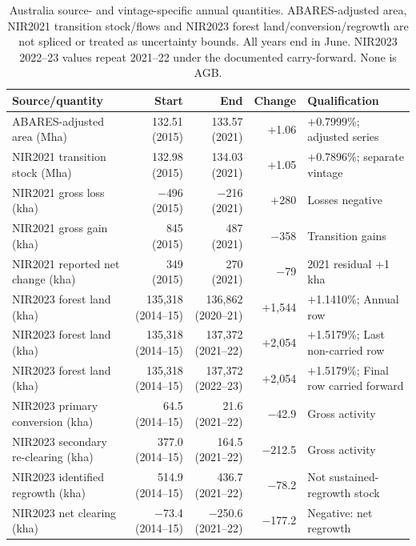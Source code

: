 \begin{table}[htbp]
\centering\small
\caption{Australia source- and vintage-specific annual quantities. ABARES-adjusted area, NIR2021 transition stock/flows and NIR2023 forest land/conversion/regrowth are not spliced or treated as uncertainty bounds. All years end in June. NIR2023 2022--23 values repeat 2021--22 under the documented carry-forward. None is AGB.}\label{tab:SI_Australia_reported}
\begin{tabularx}{\textwidth}{XrrrX}\toprule
Source/quantity & Start & End & Change & Qualification\\\midrule
ABARES-adjusted area (Mha) & 132.51 (2015) & 133.57 (2021) & $+$1.06 & $+$0.7999\%; adjusted series\\
NIR2021 transition stock (Mha) & 132.98 (2015) & 134.03 (2021) & $+$1.05 & $+$0.7896\%; separate vintage\\
NIR2021 gross loss (kha) & $-$496 (2015) & $-$216 (2021) & $+$280 & Losses negative\\
NIR2021 gross gain (kha) & 845 (2015) & 487 (2021) & $-$358 & Transition gains\\
NIR2021 reported net change (kha) & 349 (2015) & 270 (2021) & $-$79 & 2021 residual +1 kha\\
NIR2023 forest land (kha) & 135,318 (2014--15) & 136,862 (2020--21) & $+$1,544 & $+$1.1410\%; Annual row\\
NIR2023 forest land (kha) & 135,318 (2014--15) & 137,372 (2021--22) & $+$2,054 & $+$1.5179\%; Last non-carried row\\
NIR2023 forest land (kha) & 135,318 (2014--15) & 137,372 (2022--23) & $+$2,054 & $+$1.5179\%; Final row carried forward\\
NIR2023 primary conversion (kha) & 64.5 (2014--15) & 21.6 (2021--22) & $-$42.9 & Gross activity\\
NIR2023 secondary re-clearing (kha) & 377.0 (2014--15) & 164.5 (2021--22) & $-$212.5 & Gross activity\\
NIR2023 identified regrowth (kha) & 514.9 (2014--15) & 436.7 (2021--22) & $-$78.2 & Not sustained-regrowth stock\\
NIR2023 net clearing (kha) & $-$73.4 (2014--15) & $-$250.6 (2021--22) & $-$177.2 & Negative: net regrowth\\
\bottomrule\end{tabularx}
\end{table}

